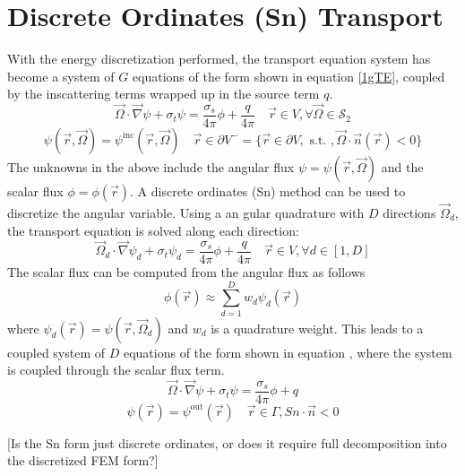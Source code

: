 \documentclass{article}
\newcommand{\vr}{\vec{r}}
\newcommand{\vO}{\vec{\Omega}}
\newcommand{\vgrad}{\vec{\nabla}}
\newcommand{\sigt}{\sigma_t}
\newcommand{\sigs}{\sigma_s}
\begin{document}
\section{Discrete Ordinates (Sn) Transport}
With the energy discretization performed, the transport equation system has become a system of $G$ equations of the form shown in equation \ref{1gTE}, coupled by the inscattering terms wrapped up in the source term $q$.
\begin{equation}
\label{1gTE}
\vO \cdot \vgrad \psi + \sigt \psi = \frac{\sigs}{4 \pi} \phi + \frac{q}{4 \pi} \quad \vr \in V , \forall \vO \in \mathcal{S}_2
\end{equation}
\begin{equation}
\psi(\vr,\vO) = \psi^{\text{inc}}(\vr,\vO) \quad \vr \in \partial V^{-} = \{ \vr \in \partial V, \text{ s.t. }, \vO \cdot \vec{n}(\vr) < 0\}
\end{equation}
The unknowns in the above include the angular flux $\psi=\psi(\vr,\vO)$ and the scalar flux $\phi=\phi(\vr)$. A discrete ordinates (Sn) method can be used to discretize the angular variable. Using a an gular quadrature with $D$ directions $\vO_d$, the transport equation is solved along each direction:
\begin{equation}
\label{1gTE}
\vO_d \cdot \vgrad \psi_d + \sigt \psi_d = \frac{\sigs}{4 \pi} \phi + \frac{q}{4 \pi} \quad \vr \in V , \forall d\in [1,D]
\end{equation}
%
The scalar flux can be computed from the angular flux as follows
\[
\phi(\vr) \approx \sum_{d=1}^D w_d \psi_d(\vr)
\] 
where $\psi_d(\vr) = \psi(\vr, \vO_d)$ and $w_d$ is a quadrature weight. This leads to a coupled system of $D$ equations of the form shown in equation \cite{SnFwd}, where the system is coupled through the scalar flux term.
%
\begin{equation}
\label{snFwd}
\vO \cdot \vgrad \psi + \sigt \psi = \frac{\sigs}{4 \pi} \phi + q
\end{equation}
\begin{equation}
\psi(\vr) = \psi^{\text{out}}(\vr) \quad \vr \in \Gamma, Sn \cdot \vec{n} < 0
\end{equation}

{\color{red}[Is the Sn form just discrete ordinates, or does it require full decomposition into the discretized FEM form?]}

\end{document}
